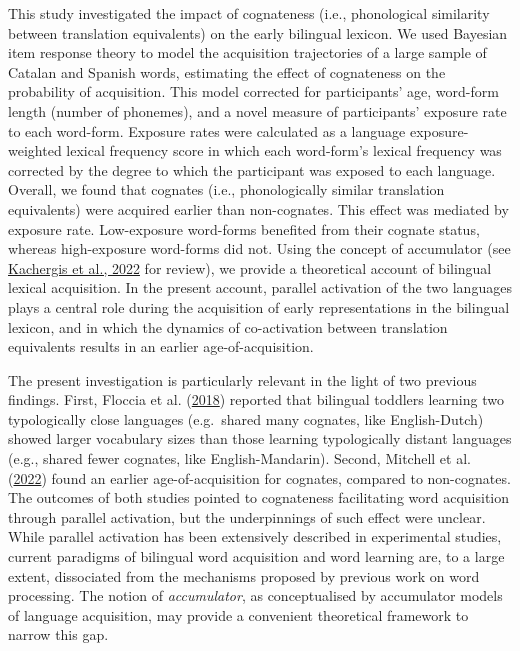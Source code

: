 \documentclass[
]{article}
\begin{document}
This study investigated the impact of cognateness (i.e., phonological
similarity between translation equivalents) on the early bilingual
lexicon. We used Bayesian item response theory to model the acquisition
trajectories of a large sample of Catalan and Spanish words, estimating
the effect of cognateness on the probability of acquisition. This model
corrected for participants' age, word-form length (number of phonemes),
and a novel measure of participants' exposure rate to each word-form.
Exposure rates were calculated as a language exposure-weighted lexical
frequency score in which each word-form's lexical frequency was
corrected by the degree to which the participant was exposed to each
language. Overall, we found that cognates (i.e., phonologically similar
translation equivalents) were acquired earlier than non-cognates. This
effect was mediated by exposure rate. Low-exposure word-forms benefited
from their cognate status, whereas high-exposure word-forms did not.
Using the concept of accumulator (see
\protect\hyperlink{ref-kachergis2022standard}{Kachergis et al., 2022}
for review), we provide a theoretical account of bilingual lexical
acquisition. In the present account, parallel activation of the two
languages plays a central role during the acquisition of early
representations in the bilingual lexicon, and in which the dynamics of
co-activation between translation equivalents results in an earlier
age-of-acquisition.

The present investigation is particularly relevant in the light of two
previous findings. First, Floccia et al.
(\protect\hyperlink{ref-floccia2018introduction}{2018}) reported that
bilingual toddlers learning two typologically close languages
(e.g.~shared many cognates, like English-Dutch) showed larger vocabulary
sizes than those learning typologically distant languages (e.g., shared
fewer cognates, like English-Mandarin). Second, Mitchell et al.
(\protect\hyperlink{ref-mitchell2022cognates}{2022}) found an earlier
age-of-acquisition for cognates, compared to non-cognates. The outcomes
of both studies pointed to cognateness facilitating word acquisition
through parallel activation, but the underpinnings of such effect were
unclear. While parallel activation has been extensively described in
experimental studies, current paradigms of bilingual word acquisition
and word learning are, to a large extent, dissociated from the
mechanisms proposed by previous work on word processing. The notion of
\emph{accumulator}, as conceptualised by accumulator models of language
acquisition, may provide a convenient theoretical framework to narrow
this gap.
\end{document}
